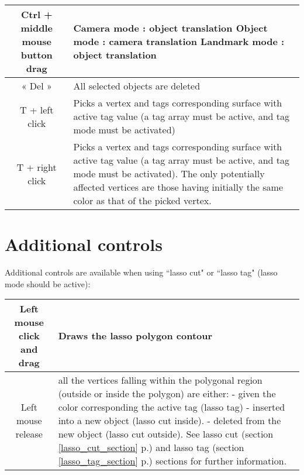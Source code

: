 \begin{tabularx}{\linewidth}{ | c | X | }
Ctrl + middle mouse button drag 
& Camera mode : object translation\newline
Object mode : camera translation\newline
Landmark mode : object translation \\ \hline			

« Del » & All selected objects are deleted \\ \hline			

T + left click & Picks a vertex and tags corresponding surface with active tag value (a tag array must be active, and tag mode must be activated)  \\ \hline			
 
T + right click & Picks a vertex and tags corresponding surface with active tag value (a tag array must be active, and tag mode must be activated). The only potentially affected vertices are those having initially the same color as that of the picked vertex.   \\ \hline			

 \end{tabularx}

\section{Additional controls}
Additional controls are available when using ``lasso cut" or ``lasso tag" (lasso mode should be active):\\
\begin{tabularx}{\linewidth}{ | c | X | }
\hline			
Left mouse click and drag & Draws  the lasso polygon contour\\ \hline			

Left mouse release &  all the vertices falling within the polygonal region (outside or inside the polygon) are either:\newline
- given the color corresponding the active tag (lasso tag)\newline
- inserted into a new object (lasso cut inside).\newline 
- deleted from the new object (lasso cut outside).\newline 
See lasso cut (section \ref{lasso_cut_section} p.\pageref{lasso_cut_section}) and lasso tag (section \ref{lasso_tag_section} p.\pageref{lasso_tag_section}) sections for further information.\\ \hline	
		

\end{tabularx}

